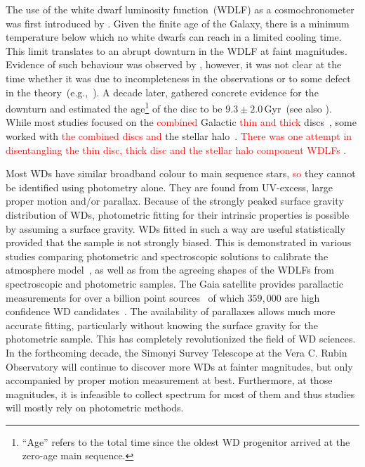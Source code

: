 \documentclass[fleqn,usenatbib]{rasti}
\begin{document}
The use of the white dwarf luminosity function~(WDLF) as a cosmochronometer was
first introduced by \citet{1959ApJ...129..243S}. Given the finite age of the
Galaxy, there is a minimum temperature below which no white dwarfs can reach in
a limited cooling time. This limit translates to an abrupt downturn in the WDLF
at faint magnitudes. Evidence of such behaviour was observed by
\citet{1979ApJ...233..226L}, however, it was not clear at the time whether it
was due to incompleteness in the observations or to some defect in the
theory~(e.g.,~\citealp{1984ApJ...282..615I}). A decade later,
\citet{1987ApJ...315L..77W} gathered concrete evidence for the downturn and
estimated the age\footnote{``Age'' refers to the total time since the oldest
WD progenitor arrived at the zero-age main sequence.} of the disc to be
$9.3 \pm 2.0$\,Gyr~(see also \citealt{1988ApJ...332..891L}). While most studies
focused on the \textcolor{red}{combined} Galactic \textcolor{red}{thin and thick} discs~\citep{1989LNP...328...15L, 1992ApJ...386..539W,
1995LNP...443...24O, 1998ApJ...497..294L, 1999MNRAS.306..736K,
2012ApJS..199...29G, 2021A&A...649A...6G}, some worked with \textcolor{red}{the combined discs and} the stellar
halo~\citep{2006AJ....131..571H, 2017AJ....153...10M, 2019MNRAS.482..715L}.
\textcolor{red}{There was one attempt in disentangling the thin disc, thick disc
and the stellar halo component WDLFs \citep{2011MNRAS.417...93R}}.
 
Most WDs have similar broadband colour to main sequence stars, \textcolor{red}{so} they cannot be
identified using photometry alone. They are found from UV-excess, large
proper motion and/or parallax. Because of the strongly peaked surface gravity
distribution of WDs, photometric fitting for their intrinsic properties
is possible by assuming a surface gravity. WDs fitted in such a way are useful
statistically provided that the sample is not strongly biased. This is
demonstrated in various studies comparing photometric and spectroscopic
solutions to calibrate the atmosphere
model~\citep{2019ApJ...871..169G, 2019ApJ...882..106G}, as well as from the
agreeing shapes of the WDLFs from spectroscopic and photometric samples. The
Gaia satellite provides parallactic measurements for over a billion point
sources~\citep{2021A&A...649A...1G, 2021AJ....161..147B} of which $359,000$
are high confidence WD candidates~\citep[][hereafter, GF21]{2021MNRAS.508.3877G}.
The availability of parallaxes allows much more accurate fitting, particularly
without knowing the surface gravity for the photometric sample. This has
completely  revolutionized the field of WD sciences. In the forthcoming decade,
the Simonyi Survey Telescope at the Vera C. Rubin Observatory will continue to
discover more WDs at fainter magnitudes, but only accompanied by proper
motion measurement at best. Furthermore, at those magnitudes, it is infeasible
to collect spectrum for most of them and thus studies will mostly rely on
photometric methods.
\end{document}
